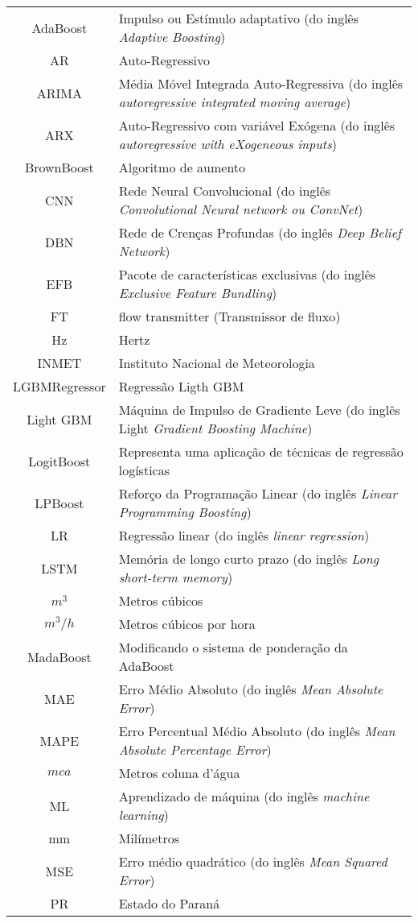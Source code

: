 \begin{tabular}{cp{}}
	AdaBoost & Impulso ou Estímulo adaptativo (do inglês \textit{Adaptive Boosting}) \\
	AR & Auto-Regressivo\\
	ARIMA & Média Móvel Integrada Auto-Regressiva (do inglês \textit{autoregressive integrated moving average}) \\
	ARX & Auto-Regressivo com variável Exógena (do inglês \textit{autoregressive with eXogeneous inputs})\\ 
	BrownBoost & Algoritmo de aumento\\
	CNN & Rede Neural Convolucional (do inglês \textit{Convolutional Neural network ou ConvNet})\\
	DBN & Rede de Crenças Profundas (do inglês \textit{Deep Belief Network}) \\
	EFB & Pacote de características exclusivas (do inglês \textit{Exclusive Feature Bundling})\\
	FT & flow transmitter (Transmissor de fluxo)\\
	Hz & Hertz\\
	INMET & Instituto Nacional de Meteorologia\\
	LGBMRegressor & Regressão Ligth GBM\\
	Light GBM & Máquina de Impulso de Gradiente Leve (do inglês Light \textit{Gradient Boosting Machine}) \\
	LogitBoost & Representa uma aplicação de técnicas de regressão logísticas\\
	LPBoost & Reforço da Programação Linear (do inglês \textit{Linear Programming Boosting}) \\
	LR & Regressão linear (do inglês \textit{linear regression})\\
	LSTM & Memória de longo curto prazo (do inglês \textit{Long short-term memory})\\
	$m^3 $ & Metros cúbicos\\
	$m^3/h $ & Metros cúbicos por hora\\
	MadaBoost & Modificando o sistema de ponderação da AdaBoost\\
	MAE & Erro Médio Absoluto (do inglês \textit{Mean Absolute Error})\\
	MAPE & Erro Percentual Médio Absoluto (do inglês \textit{Mean Absolute Percentage Error})\\
	$mca$ & Metros coluna d’água\\
	ML & Aprendizado de máquina (do inglês \textit{machine learning})\\
	mm & Milímetros\\
	MSE & Erro médio quadrático (do inglês \textit{Mean Squared Error})\\
	PR & Estado do Paraná
\end{tabular}

